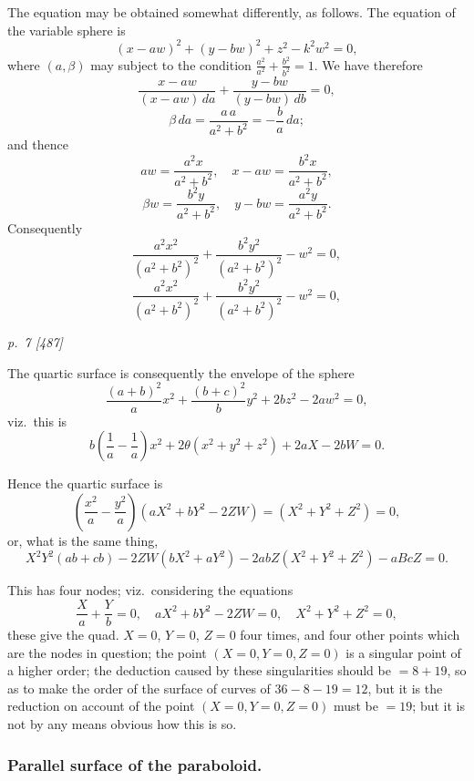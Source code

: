 \documentclass[11pt,a4paper]{article}
\theoremstyle{plain}
\theoremstyle{definition}
\begin{document}
The equation may be obtained somewhat differently, as follows. The equation of
the variable sphere is
\[
(x - aw)^2 + (y - bw)^2 + z^2 - k^2 w^2 = 0,
\]
where $(a, \beta)$ may subject to the condition $\frac{a^2}{a^2} + \frac{b^2}{b^2} = 1$.  We have therefore
\[
\frac{x - aw}{(x - aw)\,da} + \frac{y - bw}{(y - bw)\,db} = 0,
\]
\[
\beta\,da = \frac{a\,a}{a^2 + b^2} = -\frac{b}{a} \, da;
\]
and thence
\[
aw = \frac{a^2 x}{a^2 + b^2}, \quad x - aw = \frac{b^2 x}{a^2 + b^2},
\]
\[
\beta w = \frac{b^2 y}{a^2 + b^2}, \quad y - bw = \frac{a^2 y}{a^2 + b^2}.
\]
Consequently
\[
\frac{a^2 x^2}{(a^2 + b^2)^2}+\frac{b^2 y^2}{(a^2 + b^2)^2}- w^2 = 0,
\]
\[
\frac{a^2 x^2}{(a^2 + b^2)^2}+\frac{b^2 y^2}{(a^2 + b^2)^2}-w^2 = 0,
\]

\clearpage

\bigskip
\textit{p.~7 [487]}
\smallskip

The quartic surface is consequently the envelope of the sphere
\[
\frac{(a + b)^2}{a} x^2 + \frac{(b + c)^2}{b} y^2 + 2 b z^2 - 2 a w^2 = 0,
\]
viz.\ this is
\[
b\left(\frac{1}{a} - \frac{1}{a}\right) x^2 + 2\theta (x^2 + y^2 + z^2) + 2aX - 2bW = 0.
\]

Hence the quartic surface is
\[
\left(\frac{x^2}{a} - \frac{y^2}{a}\right)(aX^2 + bY^2 - 2 ZW) = (X^2 + Y^2 + Z^2) = 0,
\]
or, what is the same thing,
\[
X^2 Y^2 (ab + cb) - 2ZW (bX^2 + a Y^2) - 2abZ(X^2 + Y^2 + Z^2) - aBcZ = 0.
\]

This has four nodes; viz.\ considering the equations
\[
\frac{X}{a} + \frac{Y}{b} = 0, \quad aX^2 + bY^2 - 2ZW = 0, \quad X^2 + Y^2 + Z^2 = 0,
\]
these give the quad. $X = 0$, $Y = 0$, $Z = 0$ four times, and four other points which are
the nodes in question; the point $(X = 0, Y = 0, Z = 0)$ is a singular point of a higher
order; the deduction caused by these singularities should be $= 8 + 19$, so as to make
the order of the surface of curves of $36 - 8 - 19 = 12$, but it is the reduction on account
of the point $(X = 0, Y = 0, Z = 0)$ must be $= 19$; but it is not by any means obvious how this is so.

\subsubsection*{Parallel surface of the paraboloid.}
\end{document}
